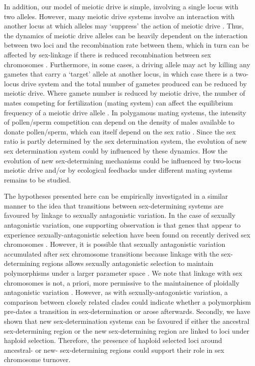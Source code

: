 \documentclass[12pt]{article}
\begin{document}
In addition, our model of meiotic drive is simple, involving a single locus with two alleles. 
However, many meiotic drive systems involve an interaction with another locus at which alleles may `suppress' the action of meiotic drive \citep{Burt:2006,Lindholm:2016cw}.
Thus, the dynamics of meiotic drive alleles can be heavily dependent on the interaction between two loci and the recombination rate between them, which in turn can be affected by sex-linkage if there is reduced recombination between sex chromosomes \citep{Hurst:1991uh}.
Furthermore, in some cases, a driving allele may act by killing any gametes that carry a `target' allele at another locus, in which case there is a two-locus drive system and the total number of gametes produced can be reduced by meiotic drive. 
Where gamete number is reduced by meiotic drive, the number of mates competing for fertilization (mating system) can affect the equilibrium frequency of a meiotic drive allele \citep{Holman:2015en}. 
In polygamous mating systems, the intensity of pollen/sperm competition can depend on the density of males available to donate pollen/sperm, which can itself depend on the sex ratio \citep{Taylor:2002wu}. 
Since the sex ratio is partly determined by the sex determination system, the evolution of new sex determination system could by influenced by these dynamics. 
How the evolution of new sex-determining mechanisms could be influenced by two-locus meiotic drive and/or by ecological feedbacks under different mating systems remains to be studied.

The hypotheses presented here can be empirically investigated in a similar manner to the idea that transitions between sex-determining systems are favoured by linkage to sexually antagonistic variation. 
In the case of sexually antagonistic variation, one supporting observation is that genes that appear to experience sexually-antagonistic selection have been found on recently derived sex chromosomes \citep{Lindholm:2002dw,Tripathi:2009cw,Ser:2010iq}.
However, it is possible that sexually antagonistic variation accumulated after sex chromosome transitions because linkage with the sex-determining regions allows sexually antagonistic selection to maintain polymorphisms under a larger parameter space \citep{Rice:1987hs,Jordan:2011fj}.
We note that linkage with sex chromosomes is not, a priori, more permissive to the maintainence of ploidally antagonistic variation \citep{Immler:2012tl}.
However, as with sexually-antagonistic variation, a comparison between closely related clades could indicate whether a polymorphism pre-dates a transition in sex-determination or arose afterwards. 
Secondly, we have shown that new sex-determination systems can be favoured if either the ancestral sex-determining region or the new sex-determining region are linked to loci under haploid selection. 
Therefore, the presence of haploid selected loci around ancestral- or new- sex-determining regions could support their role in sex chromosome turnover. 
\end{document}
